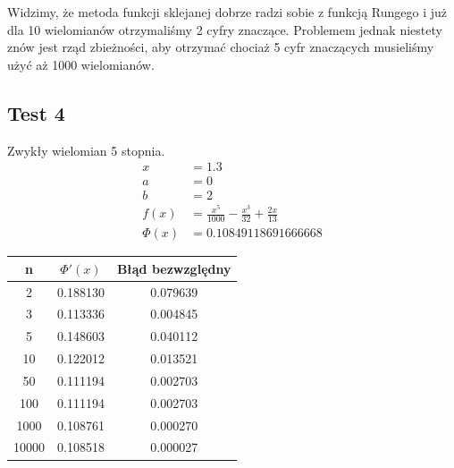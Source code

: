 \documentclass[a4paper]{article}
\begin{document}
    Widzimy, że metoda funkcji sklejanej dobrze radzi sobie z funkcją Rungego i już dla 10 wielomianów otrzymaliśmy 2 cyfry znaczące.
    Problemem jednak niestety znów jest rząd zbieżności, aby otrzymać chociaż 5 cyfr znaczących musieliśmy użyć aż 1000 wielomianów.

\newpage
\subsection{Test 4}
    Zwykły wielomian 5 stopnia.
    \[
        \begin{aligned}
            x &= 1.3 \\
            a & = 0 \\
            b &= 2 \\
            f(x) &= \frac{x^5}{1000} - \frac{x^3}{32} + \frac{2x}{13} \\
            \Phi(x) &= 0.10849118691666668
        \end{aligned}
    \]

    \begin{center}
        \begin{tabular}{|c|c|c|} 
            \hline
            n & $\Phi'(x)$ & Błąd bezwzględny \\
            \hline
            2 & 0.188130 & 0.079639 \\
            \hline
            3 & 0.113336 & 0.004845 \\
            \hline
            5 & 0.148603 & 0.040112 \\
            \hline
            10 & 0.122012 & 0.013521 \\
            \hline
            50 & 0.111194 & 0.002703 \\
            \hline
            100 & 0.111194 & 0.002703 \\
            \hline
            1000 & 0.108761 & 0.000270 \\
            \hline
            10000 & 0.108518 & 0.000027 \\
            \hline
        \end{tabular}
    \end{center}
\end{document}
